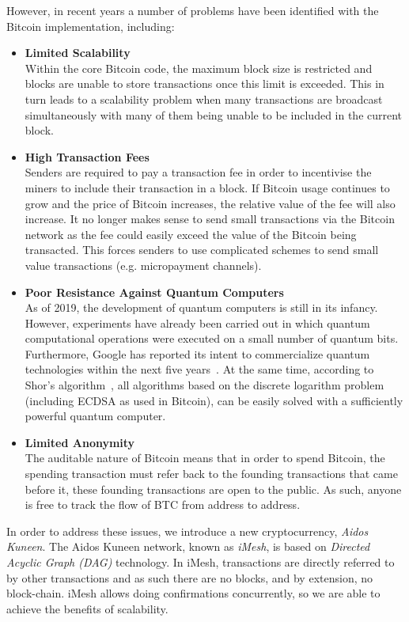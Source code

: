 \documentclass[a4paper,10pt,twocolumn]{article}
\begin{document}
	However, in recent years a number of problems have been identified with the Bitcoin implementation, including:
	\vspace{-0.5\baselineskip}
	\begin{itemize}
		\setlength\itemsep{0em}
		\item\textbf{Limited Scalability}\mbox{}\\ 
		Within the core Bitcoin code, the maximum block size is restricted and blocks are unable to store transactions once this limit 
		is exceeded. This in turn leads to a scalability problem when many transactions are broadcast simultaneously with many of them 
		being unable to be included in the current block.
		\item\textbf{High Transaction Fees}\mbox{}\\ 
		Senders are required to pay a transaction fee in order to incentivise the miners to include their transaction in a block.
		If Bitcoin usage continues to grow and the price of Bitcoin increases, the relative value of the fee will also increase.
		It no longer makes sense to send small transactions via the Bitcoin network
		as the fee could easily exceed the value of the Bitcoin being transacted. This forces senders to use complicated schemes to send small value transactions (e.g. 
		micropayment channels).
		\item\textbf{Poor Resistance Against Quantum Computers}\\ 
		As of 2019, the development of quantum computers is still in its infancy. However, experiments have already been carried out in 
		which quantum computational operations were executed on a small number of quantum bits. Furthermore, Google has reported its 
		intent to commercialize quantum technologies within the next five years~\cite{google}. At the same time, according to Shor's 
		algorithm~\cite{shor}, all algorithms based on the discrete logarithm problem (including ECDSA as used in 
		Bitcoin), can be easily solved with a sufficiently powerful quantum computer. 
		\item\textbf{Limited Anonymity}\mbox{}\\ 
		The auditable nature of Bitcoin means that in order to spend Bitcoin, the spending transaction must refer back to the founding
		transactions that came before it, these founding transactions are open to the public. As such, anyone is free to track the flow
		of BTC from address to address.
	\end{itemize}
	
	In order to address these issues, we introduce a new cryptocurrency, \emph{Aidos Kuneen}.
	The Aidos Kuneen network, known as \emph{iMesh}, is based on \emph{Directed Acyclic Graph (DAG)} technology.
	In iMesh, transactions are directly referred to by other transactions and as such there are no blocks, and by extension, no block-chain.
	iMesh allows doing confirmations concurrently, so we are able to achieve the benefits of scalability.
	
\end{document}
